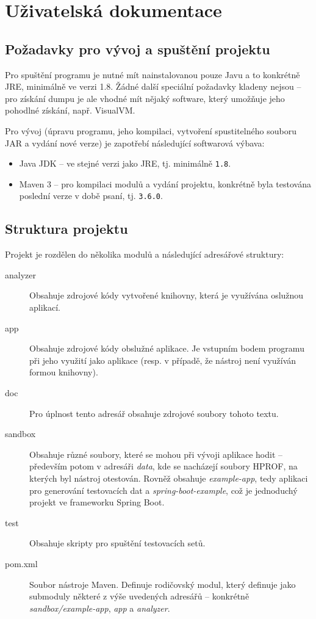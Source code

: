 \section{Uživatelská dokumentace}
\label{usage-doc}
\subsection{Požadavky pro vývoj a spuštění projektu}
Pro spuštění programu je nutné mít nainstalovanou pouze Javu a to konkrétně JRE, minimálně ve verzi 1.8. Žádné další speciální požadavky kladeny nejsou -- pro získání dumpu je ale vhodné mít nějaký software, který umožňuje jeho pohodlné získání, např. VisualVM.

Pro vývoj (úpravu programu, jeho kompilaci, vytvoření spustitelného souboru JAR a vydání nové verze) je zapotřebí následující softwarová výbava:
\begin{itemize}
    \item Java JDK -- ve stejné verzi jako JRE, tj. minimálně \texttt{1.8}.
    \item Maven 3 -- pro kompilaci modulů a vydání projektu, konkrétně byla testována poslední verze v době psaní, tj. \texttt{3.6.0}.
\end{itemize}

\subsection{Struktura projektu}
Projekt je rozdělen do několika modulů a následující adresářové struktury:

\begin{description}
    \item[analyzer] Obsahuje zdrojové kódy vytvořené knihovny, která je využívána oslužnou aplikací.
    \item[app] Obsahuje zdrojové kódy obslužné aplikace. Je vstupním bodem programu při jeho využití jako aplikace (resp. v případě, že nástroj není využíván formou knihovny).
    \item[doc] Pro úplnost tento adresář obsahuje zdrojové soubory tohoto textu.
    \item[sandbox] Obsahuje různé soubory, které se mohou při vývoji aplikace hodit -- především potom v adresáři \textit{data}, kde se nacházejí soubory HPROF, na kterých byl nástroj otestován. Rovněž obsahuje \textit{example-app}, tedy aplikaci pro generování testovacích dat a \textit{spring-boot-example}, což je jednoduchý projekt ve frameworku Spring Boot.
    \item[test] Obsahuje skripty pro spuštění testovacích setů.
    \item[pom.xml] Soubor nástroje Maven. Definuje rodičovský modul, který definuje jako submoduly některé z výše uvedených adresářů -- konkrétně \textit{sandbox/example-app}, \textit{app} a \textit{analyzer}.
\end{description}

